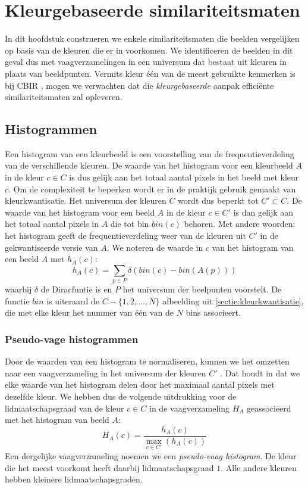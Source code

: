 \chapter{Kleurgebaseerde similariteitsmaten}

In dit hoofdstuk construeren we enkele similariteitsmaten die beelden 
vergelijken op basis van de kleuren die er in voorkomen. We identificeren de beelden
in dit geval dus met vaagverzamelingen in een universum dat bestaat uit kleuren 
in plaats van beeldpunten. Vermits kleur \'e\'en  van de meest gebruikte kenmerken is bij CBIR 
\cite{rui:image_retr, schettini:survey_of_methods_for_colour_image_indexing_and_retrieval}, mogen we 
verwachten dat die \emph{kleurgebaseerde} aanpak effici\"ente 
similariteitsmaten zal opleveren. 

\section{Histogrammen}

Een histogram van een kleurbeeld is een voorstelling van de frequentieverdeling 
van de verschillende kleuren. De waarde van het histogram voor een kleurbeeld 
$A$ in de kleur $c \in C$ is dus gelijk aan het totaal aantal pixels in het beeld met 
kleur $c$. Om de complexiteit te beperken wordt er in de praktijk gebruik gemaakt
van kleurkwantisatie. Het universum der kleuren $C$ wordt dus beperkt tot $C' \subset C$. 
De waarde van het histogram voor een beeld $A$ in de kleur $c \in C'$ is dan gelijk aan 
het totaal aantal pixels in $A$ die tot bin $bin(c)$ behoren. Met andere woorden: het histogram 
geeft de frequentieverdeling weer van de kleuren uit $C'$ in de gekwantiseerde versie van 
$A$. We noteren de waarde in $c$ van het histogram van een beeld $A$ met $h_A(c)$: 
$$ 
h_A(c) = \sum_{p \in P} \delta (bin(c) - bin(A(p))) 
$$ 
waarbij $\delta$ de Diracfuntie is en $P$ het universum der beelpunten 
voorstelt. De functie $bin$ is uiteraard de $C - \{1,2,\ldots,N\}$ afbeelding 
uit \ref{sectie:kleurkwantisatie}, die met 
elke kleur het nummer van \'e\'en van de $N$ bins associeert. 


\subsection{Pseudo-vage histogrammen}

Door de waarden van een histogram te normaliseren, kunnen we het omzetten naar 
een vaagverzameling in het universum der kleuren $C'$ 
\cite{debaets:similariteitsmaten_voor_kleurbeelden, vanderweken:similariteitsmaten, vertan:embedding_fuzzy_logic_in_cbir}. 
Dat houdt in dat we elke 
waarde van het histogram delen door het maximaal aantal pixels met dezelfde 
kleur. We hebben dus de volgende uitdrukking voor de lidmaatschapsgraad van de 
kleur $c \in C$ in de vaagverzameling $H_A$ geassocieerd met het histogram 
van beeld $A$: 
$$
H_A(c) = \frac{\displaystyle h_A(c)}{\displaystyle \max_{c \in C'}(h_A(c))}
$$ 
Een dergelijke vaagverzameling noemen we een \emph{pseudo-vaag histogram}. 
De kleur die het meest voorkomt heeft daarbij lidmaatschapsgraad $1$. Alle 
andere kleuren hebben kleinere lidmaatschapsgraden. 


